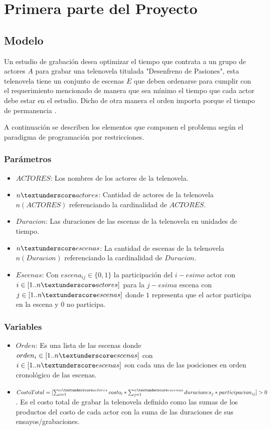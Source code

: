 \documentclass{article}
\begin{document}

\section{Primera parte del Proyecto}
\subsection{Modelo}
Un estudio de grabación desea optimizar el tiempo que contrata a un grupo de actores $A$ para grabar una telenovela titulada "Desenfreno de Pasiones", esta telenovela tiene un conjunto de escenas $E$ que deben ordenarse para cumplir con el requerimiento mencionado de manera que sea mínimo el tiempo que cada actor debe estar en el estudio. Dicho de otra manera el orden importa porque el tiempo de permanencia . \newline

A continuación se describen los elementos que componen el problema según el paradigma de programación por restricciones.

\subsubsection{Parámetros}
\begin{itemize}
    \item $ACTORES$: Los nombres de los actores de la telenovela.
    \item $n\textunderscore actores$: Cantidad de actores de la telenovela $n(ACTORES)$ referenciando la cardinalidad de $ACTORES$.
    \item $Duracion$: Las duraciones de las escenas de la telenovela en unidades de tiempo.
    \item $n\textunderscore escenas$: La cantidad de escenas de la telenovela $n(Duracion)$ referenciando la cardinalidad de $Duracion$.
    \item $Escenas$: Con $escena_{ij} \in \{0,1\}$ la participación del $i-esimo$ actor con $i \in [1..n\textunderscore actores]$ para la $j-esima$ escena con $j \in [1..n\textunderscore escenas]$ donde $1$ representa que el actor participa en la escena y $0$ no participa.    
\end{itemize}

\subsubsection{Variables}
\begin{itemize}
    \item $Orden$: Es una lista de las escenas donde $orden_i \in [1..n\textunderscore escenas]$ con $i \in [1..n\textunderscore escenas]$ son cada una de las posiciones en orden cronológico de las escenas.
    \item $CostoTotal = [\sum_{i=1}^{n\textunderscore actores} costo_i * \sum_{j=1}^{n\textunderscore escenas}duraciones_j * participacion_{ij} ]   > 0$. \newline\newline
          Es el costo total de grabar la telenovela definido como las sumas de los productos del costo de cada actor con la suma de las duraciones de sus ensayos/grabaciones.
\end{itemize}
\end{document}

